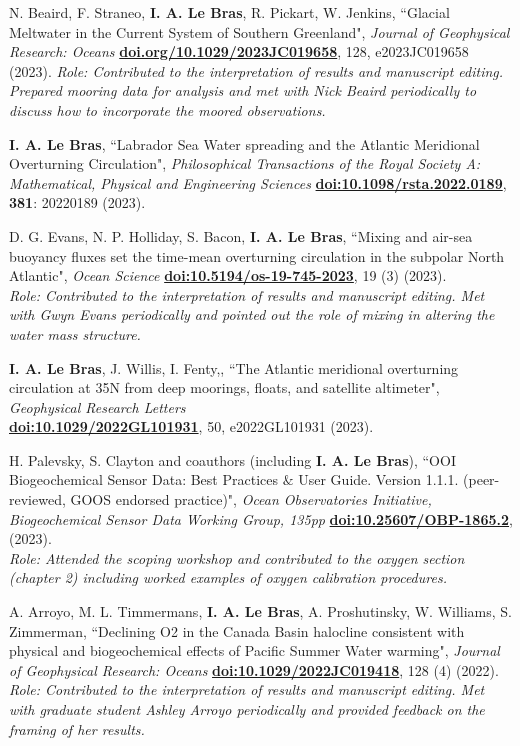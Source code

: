 \documentclass[paper=letter,fontsize=11pt]{scrartcl} %
\newcommand{\PaperEntry}[6]{
		\noindent #1, ``#2", \textit{#3} \textbf{#4}, #5 (#6).}
\begin{document}
\begin{etaremune}
\item \PaperEntry{N. Beaird, F. Straneo, \textbf{I. A. Le Bras}, R. Pickart, W. Jenkins}{Glacial Meltwater in the Current System of Southern Greenland}{Journal of Geophysical Research: Oceans}{\url{doi.org/10.1029/2023JC019658}}{128, e2023JC019658}{2023}
\emph{Role: Contributed to the interpretation of results and manuscript editing. Prepared mooring data for analysis and met with Nick Beaird periodically to discuss how to incorporate the moored observations.}\\

\item \PaperEntry{\textbf{I. A. Le Bras}}{Labrador Sea Water spreading and the Atlantic Meridional Overturning Circulation}{Philosophical Transactions of the Royal Society A: Mathematical, Physical and Engineering Sciences}{\url{doi:10.1098/rsta.2022.0189}}{\textbf{381}: 20220189}{2023}

\item \PaperEntry{D. G. Evans, N. P. Holliday, S. Bacon, \textbf{I. A. Le Bras}}{Mixing and air-sea buoyancy fluxes set the time-mean overturning circulation in the subpolar North Atlantic}{Ocean Science}{\url{doi:10.5194/os-19-745-2023}}{19 (3)}{2023}\\
\emph{Role: Contributed to the interpretation of results and manuscript editing. Met with Gwyn Evans periodically and pointed out the role of mixing in altering the water mass structure.}

\item \PaperEntry{\textbf{I. A. Le Bras}, J. Willis, I. Fenty,}{The Atlantic meridional overturning circulation at 35N from deep moorings, floats, and satellite altimeter}{Geophysical Research Letters\\}{\url{doi:10.1029/2022GL101931}}{50, e2022GL101931}{2023}

\item \PaperEntry{H. Palevsky, S. Clayton and coauthors (including \textbf{I. A. Le Bras})}{OOI Biogeochemical Sensor Data: Best Practices $\&$ User Guide. Version 1.1.1. (peer-reviewed, GOOS endorsed practice)}{Ocean Observatories Initiative, Biogeochemical Sensor Data Working Group, 135pp}{\url{doi:10.25607/OBP-1865.2}}{}{2023}\\
\emph{Role: Attended the scoping workshop and contributed to the oxygen section (chapter 2) including worked examples of oxygen calibration procedures.}

\item \PaperEntry{A. Arroyo, M. L. Timmermans, \textbf{I. A. Le Bras}, A. Proshutinsky, W. Williams, S. Zimmerman}{Declining O2 in the Canada Basin halocline consistent with physical and biogeochemical effects of Pacific Summer Water warming}{Journal of Geophysical Research: Oceans}{\url{doi:10.1029/2022JC019418}}{128 (4)}{2022}\\
\emph{Role: Contributed to the interpretation of results and manuscript editing. Met with graduate student Ashley Arroyo periodically and provided feedback on the framing of her results.}


\end{etaremune}
\end{document}
